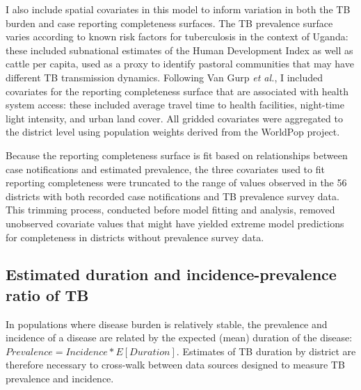 \documentclass[
]{report}
\begin{document}
I also include spatial covariates in this model to inform variation in both the TB burden and case reporting completeness surfaces. The TB prevalence surface varies according to known risk factors for tuberculosis in the context of Uganda: these included subnational estimates of the Human Development Index as well as cattle per capita, used as a proxy to identify pastoral communities that may have different TB transmission dynamics.\autocite{UgandaNationalTuberculosisandLeprosyProgramme2020a} Following Van Gurp \emph{et al.},\autocite{VanGurp2020} I included covariates for the reporting completeness surface that are associated with health system access: these included average travel time to health facilities, night-time light intensity, and urban land cover.\autocite{Weiss2020,Thomson2019} All gridded covariates were aggregated to the district level using population weights derived from the WorldPop project.\autocite{Tatem2017}

Because the reporting completeness surface is fit based on relationships between case notifications and estimated prevalence, the three covariates used to fit reporting completeness were truncated to the range of values observed in the 56 districts with both recorded case notifications and TB prevalence survey data. This trimming process, conducted before model fitting and analysis, removed unobserved covariate values that might have yielded extreme model predictions for completeness in districts without prevalence survey data.

\hypertarget{estimated-duration-and-incidence-prevalence-ratio-of-tb}{%
\subsection{Estimated duration and incidence-prevalence ratio of TB}\label{estimated-duration-and-incidence-prevalence-ratio-of-tb}}

In populations where disease burden is relatively stable, the prevalence and incidence of a disease are related by the expected (mean) duration of the disease: \(Prevalence = Incidence * E[Duration]\).\autocite{Freeman1980} Estimates of TB duration by district are therefore necessary to cross-walk between data sources designed to measure TB prevalence and incidence.
\end{document}
